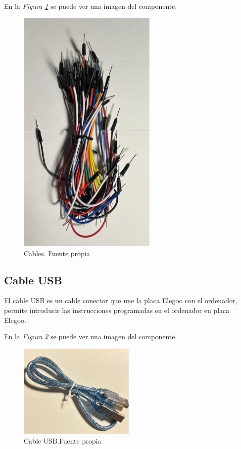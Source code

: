 En la \textit{Figura \ref{fig:cable_dupont}} se puede ver una imagen del componente.
\begin{figure}[h]
        \centering
        \includegraphics[angle=90,width=0.6\textwidth]{img/cable_dupont.png}
        \caption{Cables. Fuente propia}
        \label{fig:cable_dupont}
    \end{figure}
   
\subsection{Cable USB}
El cable USB es un cable conector que une la placa Elegoo con el ordenador, permite introducir las instrucciones programadas en el ordenador en placa Elegoo. 

En la \textit{Figura \ref{fig:Cable USB}} se puede ver una imagen del componente.
\begin{figure}[h]
        \centering
        \includegraphics[width=0.5\textwidth]{img/cable usb.png}
        \caption{Cable USB.Fuente propia}
        \label{fig:Cable USB}
    \end{figure}
   
